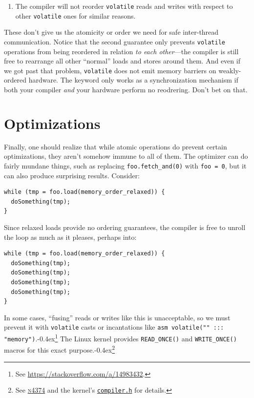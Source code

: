 \documentclass[fontsize=10pt, numbers=endperiod]{scrartcl}
\newcommand{\codesize}{\fontsize{10pt}{12pt}}
\newcommand{\punckern}{\kern-0.4ex}
\newcommand{\monobox}[1]{\mbox{\texttt{#1}}}
\newcommand{\keyword}[1]{\monobox{\color{darkGreen}#1}}
\newenvironment{colfigure}
  {\par\vspace{1\baselineskip minus 0.5\baselineskip}\noindent\minipage{\linewidth}}
  {\endminipage\vspace*{1\baselineskip minus 0.7\baselineskip}}
\begin{document}
\begin{multicols*}{2}
\begin{enumerate}
\item The compiler will not reorder \keyword{volatile}
    reads and writes with respect to other \keyword{volatile} ones
    for similar reasons.
\end{enumerate}

These don't give us the atomicity or order we need for safe
inter-thread communication.
Notice that the second guarantee only prevents \keyword{volatile} operations
from being reordered in relation \emph{to each other}---the compiler is still
free to rearrange all other ``normal'' loads and stores around them.
And even if we got past that problem, \keyword{volatile} does not emit memory
barriers on weakly-ordered hardware.
The keyword only works as a synchronization mechanism if both your compiler
\emph{and} your hardware perform no reodrering.
Don't bet on that.

\section{Optimizations}
\label{fusing}

Finally, one should realize that while atomic operations do prevent certain
optimizations, they aren't somehow immune to all of them.
The optimizer can do fairly mundane things, such as replacing
\monobox{foo.fetch\_and(0)} with \monobox{foo = 0},
but it can also produce surprising results.
Consider:
\begin{colfigure}
\begin{verbatim}
while (tmp = foo.load(memory_order_relaxed)) {
  doSomething(tmp);
}
\end{verbatim}
\end{colfigure}
Since relaxed loads provide no ordering guarantees,
the compiler is free to unroll the loop as much as it pleases,
perhaps into:
\begin{colfigure}
\begin{verbatim}
while (tmp = foo.load(memory_order_relaxed)) {
  doSomething(tmp);
  doSomething(tmp);
  doSomething(tmp);
  doSomething(tmp);
}
\end{verbatim}
\end{colfigure}
In some cases, ``fusing'' reads or writes like this is unacceptable,
so we must prevent it
with \texttt{volatile} casts or incantations like
\texttt{asm volatile("" ::: "memory")}.\punckern\footnote{See
\url{https://stackoverflow.com/a/14983432}.}
The Linux kernel provides \monobox{READ\_ONCE()} and \monobox{WRITE\_ONCE()}
macros for this exact purpose.\punckern\footnote{See
\href{http://www.open-std.org/jtc1/sc22/wg21/docs/papers/2015/n4374.html}{\textsc{n}4374}
and the kernel's
\href{http://elixir.free-electrons.com/linux/latest/source/include/linux/compiler.h}{\texttt{compiler.h}}
for details.}


\end{multicols*}
\end{document}
